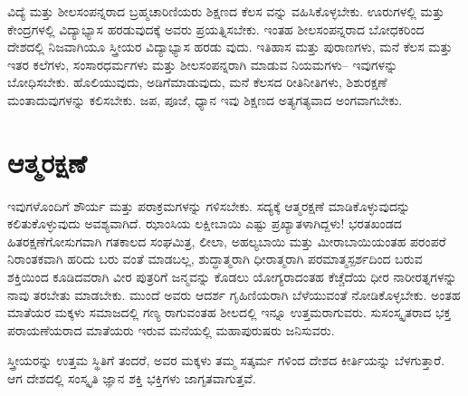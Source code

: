 ವಿದ್ಯೆ ಮತ್ತು ಶೀಲಸಂಪನ್ನರಾದ ಬ್ರಹ್ಮಚಾರಿಣಿಯರು ಶಿಕ್ಷಣದ ಕೆಲಸ ವನ್ನು ವಹಿಸಿಕೊಳ್ಳಬೇಕು. ಊರುಗಳಲ್ಲಿ ಮತ್ತು ಕೇಂದ್ರಗಳಲ್ಲಿ ವಿದ್ಯಾಭ್ಯಾಸ ಹರಡುವುದಕ್ಕೆ ಅವರು ಪ್ರಯತ್ನಿಸಬೇಕು. ಇಂತಹ ಶೀಲಸಂಪನ್ನರಾದ ಬೋಧಕರಿಂದ ದೇಶದಲ್ಲಿ ನಿಜವಾಗಿಯೂ ಸ್ತ್ರೀಯರ ವಿದ್ಯಾಭ್ಯಾಸ ಹರಡು ವುದು. ಇತಿಹಾಸ ಮತ್ತು ಪುರಾಣಗಳು, ಮನೆ ಕೆಲಸ ಮತ್ತು ಇತರ ಕಲೆಗಳು, ಸಂಸಾರಧರ್ಮಗಳು ಮತ್ತು ಶೀಲಸಂಪನ್ನರಾಗಿ ಮಾಡುವ ನಿಯಮಗಳು– ಇವುಗಳನ್ನು ಬೋಧಿಸಬೇಕು. ಹೊಲಿಯುವುದು, ಅಡಿಗೆಮಾಡುವುದು, ಮನೆ ಕೆಲಸದ ರೀತಿನೀತಿಗಳು, ಶಿಶುರಕ್ಷಣೆ ಮಂತಾದುವುಗಳನ್ನು ಕಲಿಸಬೇಕು. ಜಪ, ಪೂಜೆ, ಧ್ಯಾನ ಇವು ಶಿಕ್ಷಣದ ಅತ್ಯಗತ್ಯವಾದ ಅಂಗವಾಗಬೇಕು.


\section{ಆತ್ಮರಕ್ಷಣೆ}

ಇವುಗಳೊಂದಿಗೆ ಶೌರ್ಯ ಮತ್ತು ಪರಾಕ್ರಮಗಳನ್ನು ಗಳಿಸಬೇಕು. ಸದ್ಯಕ್ಕೆ ಆತ್ಮರಕ್ಷಣೆ ಮಾಡಿಕೊಳ್ಳುವುದನ್ನು ಕಲಿತುಕೊಳ್ಳುವುದು ಅವಶ್ಯವಾಗಿದೆ. ಝಾಂಸಿಯ ಲಕ್ಷೀಬಾಯಿ ಎಷ್ಟು ಪ್ರಖ್ಯಾತಳಾಗಿದ್ದಳು! ಭರತಖಂಡದ ಹಿತರಕ್ಷಣೆಗೋಸುಗವಾಗಿ ಗತಕಾಲದ ಸಂಘಮಿತ್ರ, ಲೀಲಾ, ಅಹಲ್ಯಬಾಯಿ ಮತ್ತು ಮೀರಾಬಾಯಿಯಂತಹ ಪರಂಪರೆ ನಿರಾಂತಕವಾಗಿ ಹರಿದು ಬರು ವಂತೆ ಮಾಡಬಲ್ಲ, ಶುದ್ಧಾತ್ಮರಾಗಿ ಧೀರಾತ್ಮರಾಗಿ ಪರಮಾತ್ಮಸ್ಪರ್ಶದಿಂದ ಬರುವ ಶಕ್ತಿಯಿಂದ ಕೂಡಿದವರಾಗಿ ವೀರ ಪುತ್ರರಿಗೆ ಜನ್ಮವನ್ನು ಕೊಡಲು ಯೋಗ್ಯರಾದಂತಹ ಕೆಚ್ಚೆದೆಯ ಧೀರ ನಾರೀರತ್ನಗಳನ್ನು ನಾವು ತರಬೇತು ಮಾಡಬೇಕು. ಮುಂದೆ ಅವರು ಆದರ್ಶ ಗೃಹಿಣಿಯರಾಗಿ ಬೆಳೆಯುವಂತೆ ನೋಡಿಕೊಳ್ಳಬೇಕು. ಅಂತಹ ಮಾತೆಯರ ಮಕ್ಕಳು ಸಮಾಜದಲ್ಲಿ ಗಣ್ಯ ರಾಗುವಂತಹ ಶೀಲದಲ್ಲಿ ಇನ್ನೂ ಉತ್ತಮರಾಗುವರು. ಸುಸಂಸ್ಕೃತರಾದ ಭಕ್ತ ಪರಾಯಣೆಯರಾದ ಮಾತೆಯರು ಇರುವ ಮನೆಯಲ್ಲಿ ಮಹಾಪುರುಷರು ಜನಿಸುವರು.

ಸ್ತ್ರೀಯರನ್ನು ಉತ್ತಮ ಸ್ಥಿತಿಗೆ ತಂದರೆ, ಅವರ ಮಕ್ಕಳು ತಮ್ಮ ಸತ್ಕರ್ಮ ಗಳಿಂದ ದೇಶದ ಕೀರ್ತಿಯನ್ನು ಬೆಳಗುತ್ತಾರೆ. ಆಗ ದೇಶದಲ್ಲಿ ಸಂಸ್ಕೃತಿ ಜ್ಞಾನ ಶಕ್ತಿ ಭಕ್ತಿಗಳು ಜಾಗೃತವಾಗುತ್ತವೆ.

